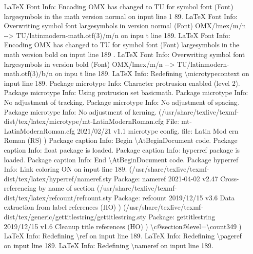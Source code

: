 \documentclass[
  letterpaper,
  DIV=11,
  numbers=noendperiod]{scrartcl}
\newenvironment{Shaded}{\begin{snugshade}}{\end{snugshade}}
\newcommand{\NormalTok}[1]{\textcolor[rgb]{0.00,0.23,0.31}{#1}}
\begin{document}
\begin{Shaded}
\begin{Highlighting}[]
\NormalTok{LaTeX Font Info:    Encoding \textasciigrave{}OMX\textquotesingle{} has changed to \textasciigrave{}TU\textquotesingle{} for symbol font}
\NormalTok{(Font)              \textasciigrave{}largesymbols\textquotesingle{} in the math version \textasciigrave{}normal\textquotesingle{} on input line 1}
\NormalTok{89.}
\NormalTok{LaTeX Font Info:    Overwriting symbol font \textasciigrave{}largesymbols\textquotesingle{} in version \textasciigrave{}normal\textquotesingle{}}
\NormalTok{(Font)                  OMX/lmex/m/n {-}{-}\textgreater{} TU/latinmodern{-}math.otf(3)/m/n on inpu}
\NormalTok{t line 189.}
\NormalTok{LaTeX Font Info:    Encoding \textasciigrave{}OMX\textquotesingle{} has changed to \textasciigrave{}TU\textquotesingle{} for symbol font}
\NormalTok{(Font)              \textasciigrave{}largesymbols\textquotesingle{} in the math version \textasciigrave{}bold\textquotesingle{} on input line 189}
\NormalTok{.}
\NormalTok{LaTeX Font Info:    Overwriting symbol font \textasciigrave{}largesymbols\textquotesingle{} in version \textasciigrave{}bold\textquotesingle{}}
\NormalTok{(Font)                  OMX/lmex/m/n {-}{-}\textgreater{} TU/latinmodern{-}math.otf(3)/b/n on inpu}
\NormalTok{t line 189.}
\NormalTok{LaTeX Info: Redefining \textbackslash{}microtypecontext on input line 189.}
\NormalTok{Package microtype Info: Character protrusion enabled (level 2).}
\NormalTok{Package microtype Info: Using protrusion set \textasciigrave{}basicmath\textquotesingle{}.}
\NormalTok{Package microtype Info: No adjustment of tracking.}
\NormalTok{Package microtype Info: No adjustment of spacing.}
\NormalTok{Package microtype Info: No adjustment of kerning.}
\NormalTok{(/usr/share/texlive/texmf{-}dist/tex/latex/microtype/mt{-}LatinModernRoman.cfg}
\NormalTok{File: mt{-}LatinModernRoman.cfg 2021/02/21 v1.1 microtype config. file: Latin Mod}
\NormalTok{ern Roman (RS)}
\NormalTok{)}
\NormalTok{Package caption Info: Begin \textbackslash{}AtBeginDocument code.}
\NormalTok{Package caption Info: float package is loaded.}
\NormalTok{Package caption Info: hyperref package is loaded.}
\NormalTok{Package caption Info: End \textbackslash{}AtBeginDocument code.}
\NormalTok{Package hyperref Info: Link coloring ON on input line 189.}
\NormalTok{(/usr/share/texlive/texmf{-}dist/tex/latex/hyperref/nameref.sty}
\NormalTok{Package: nameref 2021{-}04{-}02 v2.47 Cross{-}referencing by name of section}
\NormalTok{(/usr/share/texlive/texmf{-}dist/tex/latex/refcount/refcount.sty}
\NormalTok{Package: refcount 2019/12/15 v3.6 Data extraction from label references (HO)}
\NormalTok{) (/usr/share/texlive/texmf{-}dist/tex/generic/gettitlestring/gettitlestring.sty}
\NormalTok{Package: gettitlestring 2019/12/15 v1.6 Cleanup title references (HO)}
\NormalTok{)}
\NormalTok{\textbackslash{}c@section@level=\textbackslash{}count349}
\NormalTok{)}
\NormalTok{LaTeX Info: Redefining \textbackslash{}ref on input line 189.}
\NormalTok{LaTeX Info: Redefining \textbackslash{}pageref on input line 189.}
\NormalTok{LaTeX Info: Redefining \textbackslash{}nameref on input line 189.}


\end{Highlighting}
\end{Shaded}
\end{document}
